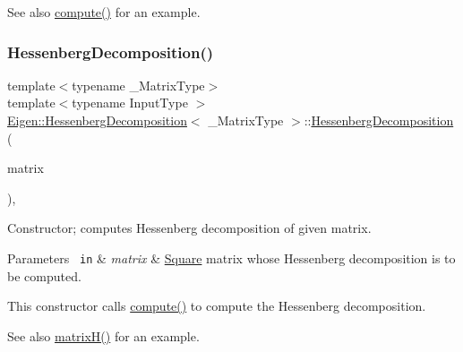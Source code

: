 \begin{DoxySeeAlso}{See also}
\mbox{\hyperlink{class_eigen_1_1_hessenberg_decomposition_a239a6fd42c57aab3c0b048c47fde3004}{compute()}} for an example. 
\end{DoxySeeAlso}
\mbox{\label{class_eigen_1_1_hessenberg_decomposition_acd22602a3e3e5a02f79990ba1e445dc9}} 
\subsubsection{\texorpdfstring{HessenbergDecomposition()}{HessenbergDecomposition()}\hspace{0.1cm}{\footnotesize\ttfamily [2/2]}}
{\footnotesize\ttfamily template$<$typename \+\_\+\+Matrix\+Type$>$ \\
template$<$typename Input\+Type $>$ \\
\mbox{\hyperlink{class_eigen_1_1_hessenberg_decomposition}{Eigen\+::\+Hessenberg\+Decomposition}}$<$ \+\_\+\+Matrix\+Type $>$\+::\mbox{\hyperlink{class_eigen_1_1_hessenberg_decomposition}{Hessenberg\+Decomposition}} (\begin{DoxyParamCaption}\item[{const \mbox{\hyperlink{struct_eigen_1_1_eigen_base}{Eigen\+Base}}$<$ Input\+Type $>$ \&}]{matrix }\end{DoxyParamCaption})\hspace{0.3cm}{\ttfamily [inline]}, {\ttfamily [explicit]}}



Constructor; computes Hessenberg decomposition of given matrix. 


\begin{DoxyParams}[1]{Parameters}
\mbox{\texttt{ in}}  & {\em matrix} & \mbox{\hyperlink{class_square}{Square}} matrix whose Hessenberg decomposition is to be computed.\\
\hline
\end{DoxyParams}
This constructor calls \mbox{\hyperlink{class_eigen_1_1_hessenberg_decomposition_a239a6fd42c57aab3c0b048c47fde3004}{compute()}} to compute the Hessenberg decomposition.

\begin{DoxySeeAlso}{See also}
\mbox{\hyperlink{class_eigen_1_1_hessenberg_decomposition_a8e781d2e22a2304647bcf0ae913cc8ea}{matrix\+H()}} for an example. 
\end{DoxySeeAlso}


